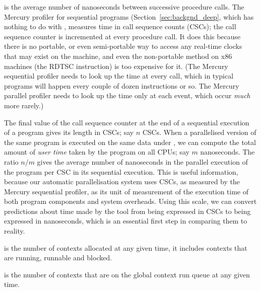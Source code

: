is the average number of nanoseconds between successive procedure calls.
The Mercury profiler for sequential programs \citep{conway:2001:mercury-deep}
(Section~\ref{sec:backgnd_deep},
which has nothing to do with \tscope,
measures time in call sequence counts (CSCs);
the call sequence counter is incremented at every procedure call.
It does this because there is no portable, or even semi-portable way
to access any real-time clocks that may exist on the machine,
and even the non-portable method on x86 machines (the RDTSC instruction)
is too expensive for it.
(The Mercury sequential profiler needs to look up the time at every call,
which in typical programs will happen every couple of dozen instructions or so.
The Mercury parallel profiler needs to look up the time only at each event,
which occur \emph{much} more rarely.)

The final value of the call sequence counter
at the end of a sequential execution of a program
gives its length in CSCs; say $n$ CSCs.
When a parallelised version of the same program is executed on the same data
under \tscope,
we can compute the total amount of \emph{user time}
taken by the program on all CPUs; say $m$ nanoseconds.
The ratio $n/m$ gives the average number of nanoseconds
in the parallel execution of the program
per CSC in its sequential execution.
This is useful information,
because our automatic parallelisation system
uses CSCs, as measured by the Mercury sequential profiler,
as its unit of measurement of the execution time
of both program components and system overheads.
Using this scale, we can convert predictions about time made by the tool
from being expressed in CSCs to being expressed in nanoseconds,
which is an essential first step in comparing them to reality.

 is the number of contexts allocated at any given
time,
it includes contexts that are running, runnable and blocked.

 is the number of contexts that are on the global
context run queue at any given time.

